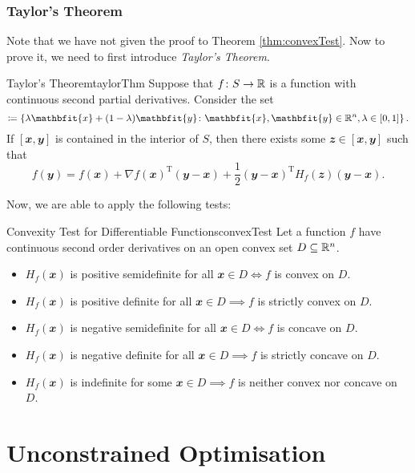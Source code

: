 \documentclass[math, code]{amznotes}
\theoremstyle{remark}
\begin{document}
\subsection{Taylor's Theorem}
Note that we have not given the proof to Theorem \ref{thm:convexTest}. Now to prove it, we need to first introduce \textit{Taylor's Theorem}.
\begin{thmbox}{Taylor's Theorem}{taylorThm}
    Suppose that $f \colon S \to \mathbb{R}$ is a function with continuous second partial derivatives. Consider the set
    \begin{displaymath}
        [\mathbfit{x}, \mathbfit{y}] \coloneqq \left\{\lambda\mathbfit{x} + (1 - \lambda)\mathbfit{y} \colon \mathbfit{x}, \mathbfit{y} \in \R^n, \lambda \in [0, 1]\right\}.
    \end{displaymath}
    If $[\mathbfit{x}, \mathbfit{y}]$ is contained in the interior of $S$, then there exists some $\mathbfit{z} \in [\mathbfit{x}, \mathbfit{y}]$ such that
    \begin{equation*}
        f(\mathbfit{y}) = f(\mathbfit{x}) + \nabla f(\mathbfit{x})^{\mathrm{T}}(\mathbfit{y - x}) + \frac{1}{2}(\mathbfit{y - x})^{\mathrm{T}}H_f(\mathbfit{z})(\mathbfit{y - x}).
    \end{equation*}
\end{thmbox}
Now, we are able to apply the following tests:
\begin{thmbox}{Convexity Test for Differentiable Functions}{convexTest}
    Let a function $f$ have continuous second order derivatives on an open convex set $D \subseteq \mathbb{R}^n$.
    \begin{itemize}
        \item $H_f(\mathbfit{x})$ is positive semidefinite for all $\mathbfit{x} \in D \iff f$ is convex on $D$.
        \item $H_f(\mathbfit{x})$ is positive definite for all $\mathbfit{x} \in D \implies f$ is strictly convex on $D$.
        \item $H_f(\mathbfit{x})$ is negative semidefinite for all $\mathbfit{x} \in D \iff f$ is concave on $D$.
        \item $H_f(\mathbfit{x})$ is negative definite for all $\mathbfit{x} \in D \implies f$ is strictly concave on $D$.
        \item $H_f(\mathbfit{x})$ is indefinite for some $\mathbfit{x} \in D \implies f$ is neither convex nor concave on $D$.
    \end{itemize}
\end{thmbox}
\chapter{Unconstrained Optimisation}
\end{document}
